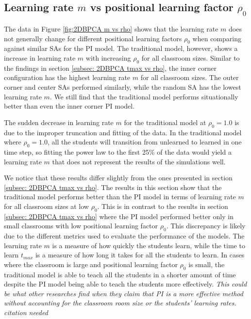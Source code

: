 \newpage

\subsection{Learning rate $m$ vs positional learning factor $\rho_0$}

The data in Figure \ref{fig:2DBPCA m vs rho} shows that the learning rate $m$ does not generally change for different positional learning factors $\rho_0$ when comparing against similar SAs for the PI model. 
The traditional model, however, shows a increase in learning rate $m$ with increasing $\rho_0$ for all classroom sizes. 
Similar to the findings in section \ref{subsec: 2DBPCA tmax vs rho}, the inner corner configuration has the highest learning rate $m$ for all classroom sizes. 
The outer corner and center SAs performed similarly, while the random SA has the lowest learning rate $m$. We still find that the traditional model performs situationally better than even the inner corner PI model. 

The sudden decrease in learning rate $m$ for the traditional model at $\rho_0 = 1.0$ is due to the improper truncation and fitting of the data. 
In the traditional model where $\rho_0 = 1.0$, all the students will transition from unlearned to learned in one time step, so fitting the power law to the first 25\% of the data would yield a learning rate $m$ that does not represent the results of the simulations well.

We notice that these results differ slightly from the ones presented in section \ref{subsec: 2DBPCA tmax vs rho}. 
The results in this section show that the traditional model performs better than the PI model in terms of learning rate $m$ for all classroom sizes at low $\rho_0$. 
This is in contrast to the results in section \ref{subsec: 2DBPCA tmax vs rho} where the PI model performed better only in small classrooms with low positional learning factor $\rho_0$. 
This discrepancy is likely due to the different metrics used to evaluate the performance of the models. The learning rate $m$ is a measure of how quickly the students learn, while the time to learn $t_{max}$ is a measure of how long it takes for all the students to learn. 
In cases where the classroom is large and positional learning factor $\rho_0$ is small, the traditional model is able to teach all the students in a shorter amount of time despite the PI model being able to teach the students more effectively. 
\textit{This could be what other researches find when they claim that PI is a more effective method without accounting for the classroom room size or the students' learning rates. citation needed}

